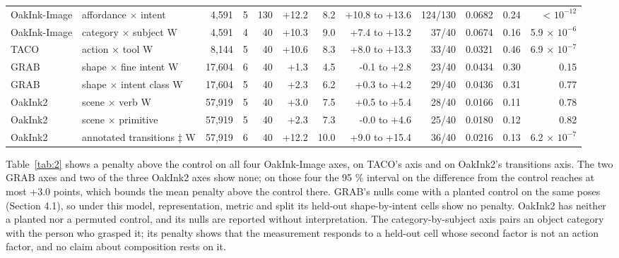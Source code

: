 \documentclass[10pt]{article}
\begin{document}
\begin{table}[t]
\begin{center}
\begin{tabular}{lp{}rrrrrrrrrr}
OakInk-Image & affordance $\times$ intent & 4,591 & 5 & 130 & +12.2 & 8.2 & +10.8 to +13.6 & 124/130 & 0.0682 & 0.24 & < $10^{-12}$ \\
OakInk-Image & category $\times$ subject W & 4,591 & 4 & 40 & +10.3 & 9.0 & +7.4 to +13.2 & 37/40 & 0.0674 & 0.16 & 5.9 $\times$ $10^{-6}$ \\
TACO & action $\times$ tool W & 8,144 & 5 & 40 & +10.6 & 8.3 & +8.0 to +13.3 & 33/40 & 0.0321 & 0.46 & 6.9 $\times$ $10^{-7}$ \\
GRAB & shape $\times$ fine intent W & 17,604 & 6 & 40 & +1.3 & 4.5 & -0.1 to +2.8 & 23/40 & 0.0434 & 0.30 & 0.15 \\
GRAB & shape $\times$ intent class W & 17,604 & 5 & 40 & +2.3 & 6.2 & +0.3 to +4.2 & 29/40 & 0.0436 & 0.31 & 0.77 \\
OakInk2 & scene $\times$ verb W & 57,919 & 5 & 40 & +3.0 & 7.5 & +0.5 to +5.4 & 28/40 & 0.0166 & 0.11 & 0.78 \\
OakInk2 & scene $\times$ primitive & 57,919 & 5 & 40 & +2.3 & 7.3 & -0.0 to +4.6 & 25/40 & 0.0180 & 0.12 & 0.82 \\
OakInk2 & annotated transitions $\ddagger$ W & 57,919 & 6 & 40 & +12.2 & 10.0 & +9.0 to +15.4 & 36/40 & 0.0216 & 0.13 & 6.2 $\times$ $10^{-7}$ \\
\bottomrule
\end{tabular}
\end{center}
\end{table}

Table~\ref{tab:2} shows a penalty above the control on all four OakInk-Image axes, on TACO's axis and on OakInk2's transitions axis. The two GRAB axes and two of the three OakInk2 axes show none; on those four the 95 \% interval on the difference from the control reaches at most +3.0 points, which bounds the mean penalty above the control there. GRAB's nulls come with a planted control on the same poses (Section 4.1), so under this model, representation, metric and split its held-out shape-by-intent cells show no penalty. OakInk2 has neither a planted nor a permuted control, and its nulls are reported without interpretation. The category-by-subject axis pairs an object category with the person who grasped it; its penalty shows that the measurement responds to a held-out cell whose second factor is not an action factor, and no claim about composition rests on it.
\end{document}
